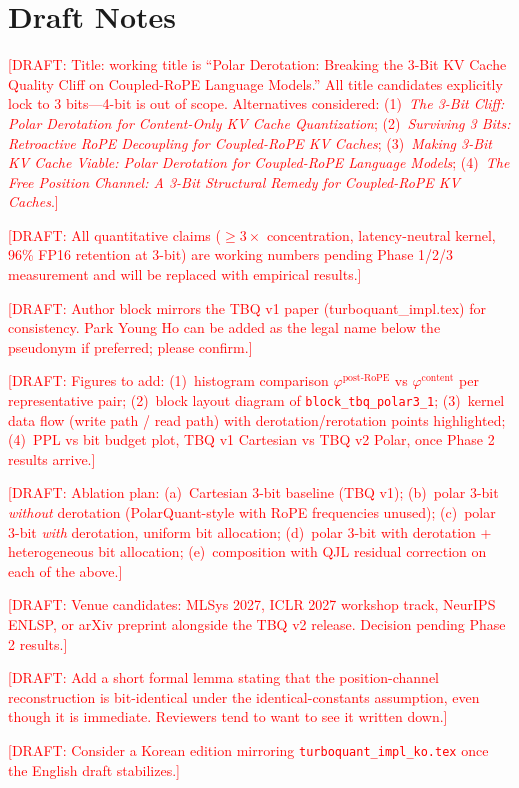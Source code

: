 \documentclass[10pt,twocolumn]{article}
\newcommand{\draftnote}[1]{\textcolor{red}{[DRAFT: #1]}}
\begin{document}
\appendix

\section*{Draft Notes}

\draftnote{Title: working title is ``Polar Derotation: Breaking the 3-Bit KV Cache Quality Cliff on Coupled-RoPE Language Models.'' All title candidates explicitly lock to 3 bits---4-bit is out of scope. Alternatives considered: (1)~\textit{The 3-Bit Cliff: Polar Derotation for Content-Only KV Cache Quantization}; (2)~\textit{Surviving 3 Bits: Retroactive RoPE Decoupling for Coupled-RoPE KV Caches}; (3)~\textit{Making 3-Bit KV Cache Viable: Polar Derotation for Coupled-RoPE Language Models}; (4)~\textit{The Free Position Channel: A 3-Bit Structural Remedy for Coupled-RoPE KV Caches}.}

\draftnote{All quantitative claims ($\geq 3\times$ concentration, latency-neutral kernel, 96\% FP16 retention at 3-bit) are working numbers pending Phase 1/2/3 measurement and will be replaced with empirical results.}

\draftnote{Author block mirrors the TBQ v1 paper (turboquant\_impl.tex) for consistency. Park Young Ho can be added as the legal name below the pseudonym if preferred; please confirm.}

\draftnote{Figures to add: (1)~histogram comparison $\varphi^{\text{post-RoPE}}$ vs $\varphi^{\text{content}}$ per representative pair; (2)~block layout diagram of \texttt{block\_tbq\_polar3\_1}; (3)~kernel data flow (write path / read path) with derotation/rerotation points highlighted; (4)~PPL vs bit budget plot, TBQ v1 Cartesian vs TBQ v2 Polar, once Phase 2 results arrive.}

\draftnote{Ablation plan: (a)~Cartesian 3-bit baseline (TBQ v1); (b)~polar 3-bit \emph{without} derotation (PolarQuant-style with RoPE frequencies unused); (c)~polar 3-bit \emph{with} derotation, uniform bit allocation; (d)~polar 3-bit with derotation + heterogeneous bit allocation; (e)~composition with QJL residual correction on each of the above.}

\draftnote{Venue candidates: MLSys 2027, ICLR 2027 workshop track, NeurIPS ENLSP, or arXiv preprint alongside the TBQ v2 release. Decision pending Phase 2 results.}

\draftnote{Add a short formal lemma stating that the position-channel reconstruction is bit-identical under the identical-constants assumption, even though it is immediate. Reviewers tend to want to see it written down.}

\draftnote{Consider a Korean edition mirroring \texttt{turboquant\_impl\_ko.tex} once the English draft stabilizes.}
\end{document}
